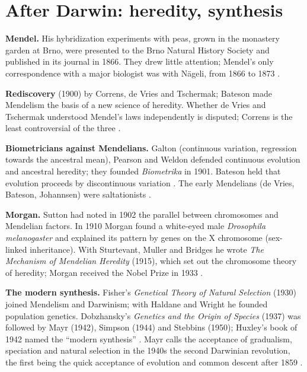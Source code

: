 \section{After Darwin: heredity, synthesis}
\label{section-after-darwin}

\textbf{Mendel.} His hybridization
experiments with peas, grown in the
monastery garden at Brno, were presented
to the Brno Natural History Society and
published in its journal in 1866. They
drew little attention; Mendel's only
correspondence with a major biologist was
with N\"ageli, from 1866 to 1873
\cite{bowler-mendel}.

\textbf{Rediscovery} (1900) by Correns, de
Vries and Tschermak; Bateson made
Mendelism the basis of a new science of
heredity. Whether de Vries and Tschermak
understood Mendel's laws independently is
disputed; Correns is the least
controversial of the three
\cite{bowler-mendelismo}.

\textbf{Biometricians against Mendelians.}
Galton (continuous variation, regression
towards the ancestral mean), Pearson and
Weldon defended continuous evolution and
ancestral heredity; they founded
\emph{Biometrika} in 1901. Bateson held
that evolution proceeds by discontinuous
variation \cite{barahona-biometrica}. The
early Mendelians (de Vries, Bateson,
Johannsen) were saltationists
\cite[Chapter 4]{mayr2002evolution}.

\textbf{Morgan.} Sutton had noted in 1902
the parallel between chromosomes and
Mendelian factors. In 1910 Morgan found a
white-eyed male \emph{Drosophila
melanogaster} and explained its pattern by
genes on the X chromosome (sex-linked
inheritance). With Sturtevant, Muller and
Bridges he wrote \emph{The Mechanism of
Mendelian Heredity} (1915), which set out
the chromosome theory of heredity; Morgan
received the Nobel Prize in 1933
\cite{barahona-morgan}.

\textbf{The modern synthesis.} Fisher's
\emph{Genetical Theory of Natural
Selection} (1930) joined Mendelism and
Darwinism; with Haldane and Wright he
founded population genetics.
Dobzhansky's \emph{Genetics and the Origin
of Species} (1937) was followed by Mayr
(1942), Simpson (1944) and Stebbins
(1950); Huxley's book of 1942 named the
``modern synthesis''
\cite{kingsland-neodarwinismo}. Mayr calls
the acceptance of gradualism, speciation
and natural selection in the 1940s the
second Darwinian revolution, the first
being the quick acceptance of evolution
and common descent after 1859
\cite[Chapter 4]{mayr2002evolution}.

